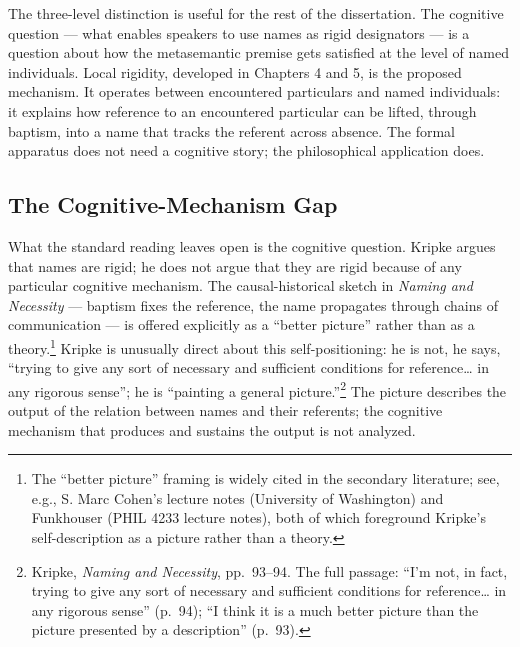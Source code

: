 \documentclass[12pt,a4paper]{article}
\begin{document}
The three-level distinction is useful for the rest of the dissertation. The cognitive question --- what enables speakers to use names as rigid designators --- is a question about how the metasemantic premise gets satisfied at the level of named individuals. Local rigidity, developed in Chapters 4 and 5, is the proposed mechanism. It operates between encountered particulars and named individuals: it explains how reference to an encountered particular can be lifted, through baptism, into a name that tracks the referent across absence. The formal apparatus does not need a cognitive story; the philosophical application does.

\subsection{The Cognitive-Mechanism Gap}\label{the-cognitive-mechanism-gap}

What the standard reading leaves open is the cognitive question. Kripke argues that names are rigid; he does not argue that they are rigid because of any particular cognitive mechanism. The causal-historical sketch in \emph{Naming and Necessity} --- baptism fixes the reference, the name propagates through chains of communication --- is offered explicitly as a ``better picture'' rather than as a theory.\footnote{The ``better picture'' framing is widely cited in the secondary literature; see, e.g., S. Marc Cohen's lecture notes (University of Washington) and Funkhouser (PHIL 4233 lecture notes), both of which foreground Kripke's self-description as a picture rather than a theory.} Kripke is unusually direct about this self-positioning: he is not, he says, ``trying to give any sort of necessary and sufficient conditions for reference\ldots{} in any rigorous sense''; he is ``painting a general picture.''\footnote{Kripke, \emph{Naming and Necessity}, pp.~93--94. The full passage: ``I'm not, in fact, trying to give any sort of necessary and sufficient conditions for reference\ldots{} in any rigorous sense'' (p.~94); ``I think it is a much better picture than the picture presented by a description'' (p.~93).} The picture describes the output of the relation between names and their referents; the cognitive mechanism that produces and sustains the output is not analyzed.
\end{document}
